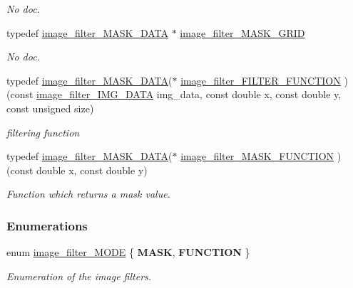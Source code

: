 \begin{DoxyCompactItemize}
\begin{DoxyCompactList}\small\item\em No doc. \end{DoxyCompactList}\item 
\hypertarget{a00012_a8249e3d997dddbfdce6ef81c25b1f3b3}{typedef \hyperlink{a00012_a4782d495f3f1d69b311256832dd5dc4b}{image\-\_\-filter\-\_\-\-M\-A\-S\-K\-\_\-\-D\-A\-T\-A} $\ast$ \hyperlink{a00012_a8249e3d997dddbfdce6ef81c25b1f3b3}{image\-\_\-filter\-\_\-\-M\-A\-S\-K\-\_\-\-G\-R\-I\-D}}\label{a00012_a8249e3d997dddbfdce6ef81c25b1f3b3}

\begin{DoxyCompactList}\small\item\em No doc. \end{DoxyCompactList}\item 
typedef \hyperlink{a00012_a4782d495f3f1d69b311256832dd5dc4b}{image\-\_\-filter\-\_\-\-M\-A\-S\-K\-\_\-\-D\-A\-T\-A}($\ast$ \hyperlink{a00012_acaed2c22ba7a7ae3c91fd6a6acb5b19a}{image\-\_\-filter\-\_\-\-F\-I\-L\-T\-E\-R\-\_\-\-F\-U\-N\-C\-T\-I\-O\-N} )(const \hyperlink{a00012_afbdd6cd26209a0a7c753b951a39160e3}{image\-\_\-filter\-\_\-\-I\-M\-G\-\_\-\-D\-A\-T\-A} img\-\_\-data, const double x, const double y, const unsigned size)
\begin{DoxyCompactList}\small\item\em filtering function \end{DoxyCompactList}\item 
typedef \hyperlink{a00012_a4782d495f3f1d69b311256832dd5dc4b}{image\-\_\-filter\-\_\-\-M\-A\-S\-K\-\_\-\-D\-A\-T\-A}($\ast$ \hyperlink{a00012_a870dae88660f8c99b3ffeb9a440e78e2}{image\-\_\-filter\-\_\-\-M\-A\-S\-K\-\_\-\-F\-U\-N\-C\-T\-I\-O\-N} )(const double x, const double y)
\begin{DoxyCompactList}\small\item\em Function which returns a mask value. \end{DoxyCompactList}\end{DoxyCompactItemize}
\subsubsection*{Enumerations}
\begin{DoxyCompactItemize}
\item 
enum \hyperlink{a00012_abecdf477ce7aa2bb6f4b6b0f218a9eea}{image\-\_\-filter\-\_\-\-M\-O\-D\-E} \{ {\bfseries M\-A\-S\-K}, 
{\bfseries F\-U\-N\-C\-T\-I\-O\-N}
 \}
\begin{DoxyCompactList}\small\item\em Enumeration of the image filters. \end{DoxyCompactList}\end{DoxyCompactItemize}
